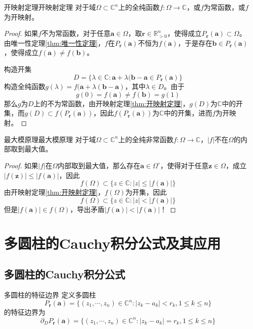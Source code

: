 \documentclass[lang = cn, scheme = chinese, thmcnt = section]{elegantbook}
\newcommand{\R}{\mathbb{R}}            %
\newcommand{\C}{\mathbb{C}}  		   %
\newcommand{\sub}{\subset}             %
\newcommand{\bs}{\boldsymbol}          %
\begin{document}
\begin{theorem}{开映射定理}{开映射定理}
	对于域$\Omega\sub\C^n$上的全纯函数$f:\Omega\to\C$，或$f$为常函数，或$f$为开映射。
\end{theorem}

\begin{proof}
	如果$f$不为常函数，对于任意$\bs{a}\in\Omega$，取$\bs{r}\in\R_{>0}^n$，使得成立$P_{\bs{r}}(\bs{a})\sub\Omega$。由唯一性定理\ref{thm:唯一性定理}，$f$在$P_{\bs{r}}(\bs{a})$不恒为$f(\bs{a})$，于是存在$\bs{b}\in P_{\bs{r}}(\bs{a})$，使得成立$f(\bs{a})\ne f(\bs{b})$。
	
	构造开集
	$$
	D=\{ \lambda\in\C:\bs{a}+\lambda(\bs{b}-\bs{a}\in P_{\bs{r}}(\bs{a}) \}
	$$
	构造全纯函数$g(\lambda)=f(\bs{a}+\lambda(\bs{b}-\bs{a})$，其中$\lambda\in D$。由于
	$$
	g(0)=f(\bs{a})\ne f(\bs{b})=g(1)
	$$
	那么$g$为$D$上的不为常函数，由开映射定理\ref{thm:开映射定理}，$g(D)$为$\C$中的开集，而$g(D)\sub f(P_{\bs{r}}(\bs{a}))$，因此$f(P_{\bs{r}}(\bs{a}))$为$\C$中的开集，进而$f$为开映射。
\end{proof}

\begin{theorem}{最大模原理}{最大模原理}
	对于域$\Omega\sub\C^n$上的全纯非常函数$f:\Omega\to\C$，$|f|$不在$\Omega$的内部取到最大值。
\end{theorem}

\begin{proof}
	如果$|f|$在$\Omega$内部取到最大值，那么存在$\bs{a}\in\Omega^\circ$，使得对于任意$\bs{z}\in\Omega$，成立$|f(\bs{z})|\le |f(\bs{a})|$，因此
	$$
	f(\Omega)\sub \{ z\in\C:|z|\le |f(\bs{a})| \}
	$$
	由开映射定理\ref{thm:开映射定理}，$f(\Omega)$为开集，因此
	$$
	f(\Omega)\sub \{ z\in\C:|z|< |f(\bs{a})| \}
	$$
	但是$|f(\bs{a})|\in f(\Omega)$，导出矛盾$|f(\bs{a})|<|f(\bs{a})|$！
\end{proof}

\section{多圆柱的Cauchy积分公式及其应用}

\subsection{多圆柱的Cauchy积分公式}

\begin{definition}{多圆柱的特征边界}
	定义多圆柱
	$$
	P_{\bs{r}}(\bs{a})=\{ (z_1,\cdots,z_n)\in\C^n:|z_k-a_k|<r_k,1\le k\le n \}
	$$
	的特征边界为
	$$
	\partial_DP_{\bs{r}}(\bs{a})
	=\{ (z_1,\cdots,z_n)\in\C^n:|z_k-a_k|=r_k,1\le k\le n \}
	$$
\end{definition}
\end{document}
